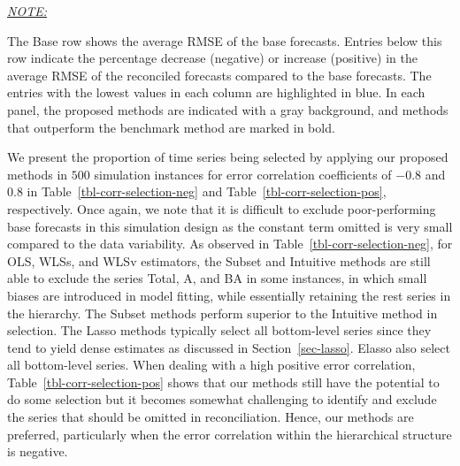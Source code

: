 \documentclass[
  12pt,
  11pt]{article}
\begin{document}
\begin{table}[!h]
{\begin{threeparttable}
\begin{tabular}{lrrrrrrrrrrrrrrrrrrrr}
\bottomrule
\end{tabular}
\begin{tablenotes}[para]
\item \underline{\textit{NOTE:}} 
\item The Base row shows the average RMSE of the base forecasts. Entries below this row indicate the percentage decrease (negative) or increase (positive) in the average RMSE of the reconciled forecasts compared to the base forecasts. The entries with the lowest values in each column are highlighted in blue. In each panel, the proposed methods are indicated with a gray background, and methods that outperform the benchmark method are marked in bold.
\end{tablenotes}
\end{threeparttable}}
\end{table}

We present the proportion of time series being selected by applying our
proposed methods in \(500\) simulation instances for error correlation
coefficients of \(-0.8\) and \(0.8\) in
Table~\ref{tbl-corr-selection-neg} and
Table~\ref{tbl-corr-selection-pos}, respectively. Once again, we note
that it is difficult to exclude poor-performing base forecasts in this
simulation design as the constant term omitted is very small compared to
the data variability. As observed in Table~\ref{tbl-corr-selection-neg},
for OLS, WLSs, and WLSv estimators, the Subset and Intuitive methods are
still able to exclude the series Total, A, and BA in some instances, in
which small biases are introduced in model fitting, while essentially
retaining the rest series in the hierarchy. The Subset methods perform
superior to the Intuitive method in selection. The Lasso methods
typically select all bottom-level series since they tend to yield dense
estimates as discussed in Section~\ref{sec-lasso}. Elasso also select
all bottom-level series. When dealing with a high positive error
correlation, Table~\ref{tbl-corr-selection-pos} shows that our methods
still have the potential to do some selection but it becomes somewhat
challenging to identify and exclude the series that should be omitted in
reconciliation. Hence, our methods are preferred, particularly when the
error correlation within the hierarchical structure is negative.
\end{document}
